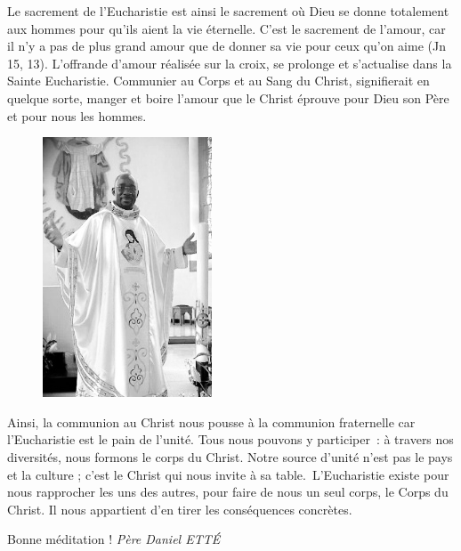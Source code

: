 Le sacrement de l’Eucharistie est ainsi le sacrement où Dieu se donne totalement aux hommes pour qu’ils aient la vie éternelle. C’est le sacrement de l’amour, car \og il n’y a pas de plus grand amour que de donner sa vie pour ceux qu’on aime \fg{} (Jn 15, 13). L’offrande d’amour réalisée sur la croix, se prolonge et s’actualise dans la Sainte Eucharistie.
Communier au Corps et au Sang du Christ, signifierait en quelque sorte, manger et boire l’amour que le Christ éprouve pour Dieu son Père et pour nous les hommes.
\begin{figure}
\vspace{-0.5cm}
	\includegraphics[scale=1.15]{../images/standing_daniel.png}
\end{figure}
Ainsi, la communion au Christ nous pousse à la communion fraternelle car l’Eucharistie est le pain de l’unité.
Tous nous pouvons y participer : à travers nos diversités, nous formons le corps du Christ. Notre source d’unité n’est pas le pays et la culture ; c’est le Christ qui nous invite à sa table. L'Eucharistie existe pour nous rapprocher les uns des autres, pour faire de nous un seul corps, le Corps du Christ. Il nous appartient d'en tirer les conséquences concrètes.



\begin{flushright}
Bonne méditation !
\textit{Père  Daniel  ETTÉ}
\end{flushright}



